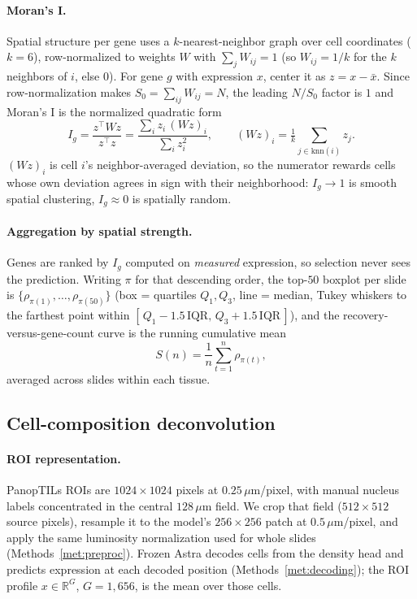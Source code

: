 \documentclass[11pt]{article}
\begin{document}
\paragraph{Moran's I.} Spatial structure per gene uses a $k$-nearest-neighbor
graph over cell coordinates ($k=6$), row-normalized to weights $W$ with
$\sum_j W_{ij}=1$ (so $W_{ij}=1/k$ for the $k$ neighbors of $i$, else $0$). For
gene $g$ with expression $x$, center it as $z=x-\bar x$. Since row-normalization
makes $S_0=\sum_{ij}W_{ij}=N$, the leading $N/S_0$ factor is $1$ and Moran's I is
the normalized quadratic form
\[
I_g=\frac{z^{\top}Wz}{z^{\top}z}
=\frac{\sum_i z_i\,(Wz)_i}{\sum_i z_i^2},
\qquad (Wz)_i=\tfrac{1}{k}\!\!\sum_{j\in\mathrm{knn}(i)}\!\! z_j .
\]
$(Wz)_i$ is cell $i$'s neighbor-averaged deviation, so the numerator rewards
cells whose own deviation agrees in sign with their neighborhood: $I_g\!\to\!1$
is smooth spatial clustering, $I_g\!\approx\!0$ is spatially random.

\paragraph{Aggregation by spatial strength.} Genes are ranked by $I_g$ computed
on \emph{measured} expression, so selection never sees the prediction. Writing
$\pi$ for that descending order, the top-$50$ boxplot per slide is
$\{\rho_{\pi(1)},\dots,\rho_{\pi(50)}\}$ (box = quartiles $Q_1,Q_3$, line =
median, Tukey whiskers to the farthest point within $[\,Q_1-1.5\,\mathrm{IQR},\,
Q_3+1.5\,\mathrm{IQR}\,]$), and the recovery-versus-gene-count curve is the
running cumulative mean
\[
S(n)=\frac{1}{n}\sum_{t=1}^{n}\rho_{\pi(t)} ,
\]
averaged across slides within each tissue.

\subsection{Cell-composition deconvolution}
\label{met:panoptils}

\paragraph{ROI representation.} PanopTILs ROIs are $1024\times1024$ pixels at
$0.25\,\mu$m/pixel, with manual nucleus labels concentrated in the central
$128\,\mu$m field. We crop that field ($512\times512$ source pixels), resample it
to the model's $256\times256$ patch at $0.5\,\mu$m/pixel, and apply the same
luminosity normalization used for whole slides (Methods~\ref{met:preproc}).
Frozen Astra decodes cells from the density head and predicts expression at each
decoded position (Methods~\ref{met:decoding}); the ROI profile
$x\in\mathbb{R}^{G}$, $G=1{,}656$, is the mean over those cells.
\end{document}

